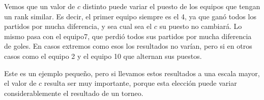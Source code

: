 Vemos que un valor de $c$ distinto puede variar el puesto de los equipos que tengan un rank similar. Es decir, el primer equipo siempre es el 4, ya que ganó todos los partidos por mucha diferencia, y sea cual sea el $c$ su puesto no cambiará. Lo mismo pasa con el equipo7, que perdió todos sus partidos por mucha diferencia de goles. En casos extremos como esos los resultados no varían, pero si en otros casos como el equipo 2 y el equipo 10 que alternan sus puestos.

Este es un ejemplo pequeño, pero si llevamos estos resultados a una escala mayor, el valor de $c$ resulta ser muy importante, porque esta elección puede variar considerablemente el resultado de un torneo.\\
